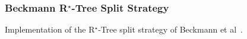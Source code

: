%
%
%
%


\subsubsection{Beckmann R$^\star$-Tree Split Strategy}

Implementation of the R$^\star$-Tree split strategy of Beckmann
et al~\cite{Beckmann:1990:RER}.

